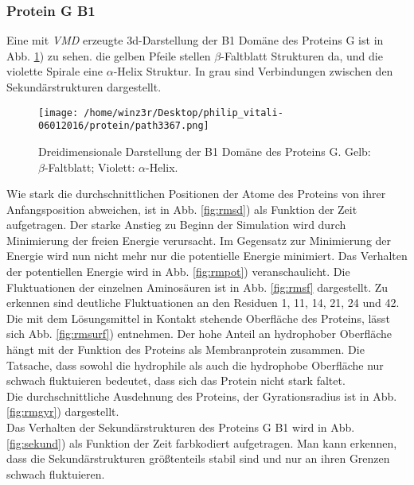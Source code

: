\subsubsection{Protein G B1}
Eine mit \emph{VMD} erzeugte 3d-Darstellung der B1 Domäne des Proteins G ist in Abb. \ref{fig:3dpgb}) zu sehen.
die gelben Pfeile stellen $\beta$-Faltblatt Strukturen da, und die violette Spirale eine $\alpha$-Helix Struktur. In grau sind Verbindungen zwischen den Sekundärstrukturen dargestellt.
\begin{figure}
\centering
\texttt{[image: /home/winz3r/Desktop/philip\_vitali-06012016/protein/path3367.png]}\caption{Dreidimensionale Darstellung der B1 Domäne des Proteins G. Gelb: $\beta$-Faltblatt; Violett: $\alpha$-Helix.}\label{fig:3dpgb}
\end{figure}
\noindent
Wie stark die durchschnittlichen Positionen der Atome des Proteins von ihrer Anfangsposition abweichen, ist in Abb. \ref{fig:rmsd}) als Funktion der Zeit aufgetragen. Der starke Anstieg zu Beginn der Simulation wird durch Minimierung der freien Energie verursacht.
Im Gegensatz zur Minimierung der Energie wird nun nicht mehr nur die potentielle Energie minimiert.
Das Verhalten der potentiellen Energie wird in Abb. \ref{fig:rmpot}) veranschaulicht.
Die Fluktuationen der einzelnen Aminosäuren ist in Abb. \ref{fig:rmsf} dargestellt. Zu erkennen sind deutliche Fluktuationen an den Residuen
1, 11, 14, 21, 24 und 42.
\\ \noindent
Die mit dem Lösungsmittel in Kontakt stehende Oberfläche des Proteins, lässt sich Abb. \ref{fig:rmsurf}) entnehmen. Der hohe Anteil an hydrophober Oberfläche hängt mit der Funktion des Proteins als Membranprotein zusammen. Die Tatsache, dass sowohl die hydrophile als auch die hydrophobe Oberfläche nur schwach fluktuieren bedeutet, dass sich das Protein nicht stark faltet.
\\ \noindent
Die durchschnittliche Ausdehnung des Proteins, der Gyrationsradius ist in Abb. \ref{fig:rmgyr}) dargestellt.
\\ \noindent
Das Verhalten der Sekundärstrukturen des Proteins G B1 wird in Abb. \ref{fig:sekund}) als Funktion der Zeit farbkodiert aufgetragen. Man kann erkennen, dass die Sekundärstrukturen
größtenteils stabil sind und nur an ihren Grenzen schwach fluktuieren.
